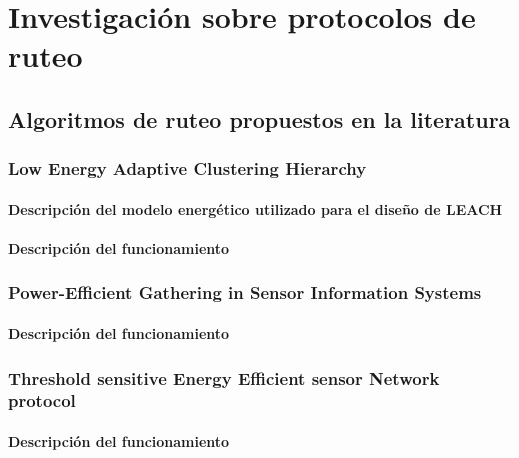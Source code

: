 \chapter{Investigación sobre protocolos de ruteo}


\section{Algoritmos de ruteo propuestos en la literatura}

\subsection{Low Energy Adaptive Clustering Hierarchy}



\subsubsection{Descripción del modelo energético utilizado para el diseño de LEACH}


\subsubsection{Descripción del funcionamiento}

\subsection{Power-Efficient Gathering in Sensor Information Systems}


\subsubsection{Descripción del funcionamiento}
\subsection{Threshold sensitive Energy Efficient sensor Network protocol}

\subsubsection{Descripción del funcionamiento}

